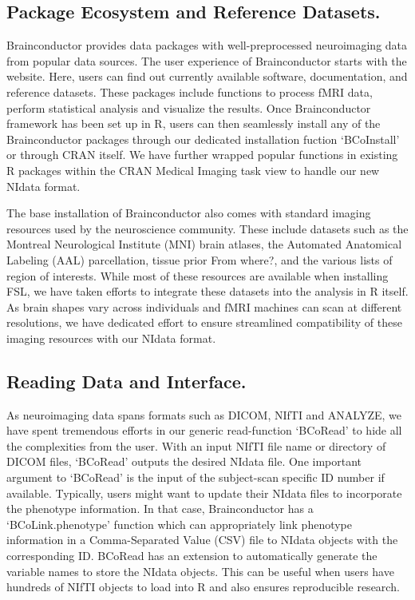 \documentclass{nature}
\begin{document}
\subsection{Package Ecosystem and Reference Datasets.}
Brainconductor provides data packages with well-preprocessed neuroimaging data
from popular data sources.
The user experience of Brainconductor starts with the website. Here, users can
find out currently available software, documentation, and reference datasets.
These packages include functions to process fMRI data, perform statistical
analysis and visualize the results.
Once Brainconductor framework has been set up in R, users can then
seamlessly install any of the Brainconductor packages through our
dedicated installation fuction `BCoInstall' or through CRAN itself.
We have further wrapped popular functions in existing R packages
within the CRAN Medical Imaging task view to handle our new NIdata format.


The base installation of Brainconductor also comes with standard imaging
resources
used by the neuroscience community. These include datasets such
as the Montreal Neurological
Institute (MNI) brain atlases, the Automated Anatomical Labeling (AAL)
parcellation\cite{tzourio2002automated},
tissue prior {\color{red}From where?},
and the various lists of region of interests. While most of these
resources are available when installing FSL, we have taken
efforts to integrate these datasets into the analysis in R itself.
As brain shapes vary across individuals
and fMRI machines can scan at different resolutions, we have
dedicated effort
to ensure streamlined compatibility of these imaging resources with our NIdata
format.

\subsection{Reading Data and Interface.}
As neuroimaging data spans formats such as DICOM, NIfTI and ANALYZE, we have
spent tremendous efforts in our generic read-function `BCoRead' to hide
all the complexities from the user. With an input NIfTI file name or directory of
DICOM files, `BCoRead' outputs the desired NIdata
file.
One important argument to `BCoRead' is the input of the subject-scan specific ID
number if available. 
Typically, users might want to update their NIdata files to incorporate the
phenotype information. In that case, Brainconductor has a `BCoLink.phenotype'
function
which can appropriately link phenotype information in a Comma-Separated Value
(CSV) file to NIdata objects with the corresponding ID. 
BCoRead has an extension to automatically generate the variable names to store
the NIdata objects. This can be useful when users have hundreds of NIfTI
objects to load into R and also ensures reproducible research.
\end{document}
